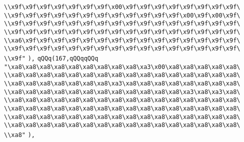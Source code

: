 \verb|\\x9f\x9f\x9f\x9f\x9f\x9f\x9f\x00\x9f\x9f\x9f\x9f\x9f\x9f\x9f\x9f\|\newline
\verb|\\x9f\x9f\x9f\x9f\x9f\x9f\x9f\x9f\x9f\x9f\x9f\x9f\x00\x9f\x00\x9f\|\newline
\verb|\\x9f\x9f\x9f\x9f\x9f\x9f\x9f\x9f\x9f\x9f\x9f\x9f\x9f\x9f\x9f\x9f\|\newline
\verb|\\x9f\x9f\x9f\x9f\x9f\x9f\x9f\x9f\x9f\x9f\x9f\x9f\x9f\x9f\x9f\x9f\|\newline
\verb|\\xa6\x9f\x9f\x9f\x9f\x9f\x9f\x9f\x9f\x9f\x9f\x9f\x9f\x9f\x9f\x9f\|\newline
\verb|\\x9f\x9f\x9f\x9f\x9f\x9f\x9f\x9f\x9f\x9f\x9f\x9f\x9f\x9f\x9f\x9f\|\newline
\verb|\\x9f"|\newline
\verb|),|\newline
\verb|qQQq(167,qQQqqQQq|\newline
\verb|"\xa8\xa8\xa8\xa8\xa8\xa8\xa8\xa8\xa8\xa3\x00\xa8\xa8\xa8\xa8\xa8\|\newline
\verb|\\xa8\xa8\xa8\xa8\xa8\xa8\xa8\xa8\xa8\xa8\xa8\xa8\xa8\xa8\xa8\xa8\|\newline
\verb|\\xa8\xa8\xa8\xa8\xa8\xa8\xa8\xa3\xa8\xa8\xa8\xa8\xa8\xa8\xa8\xa8\|\newline
\verb|\\xa8\xa8\xa8\xa8\xa8\xa8\xa8\xa8\xa8\xa8\xa8\xa8\xa3\xa8\xa3\xa8\|\newline
\verb|\\xa8\xa8\xa8\xa8\xa8\xa8\xa8\xa8\xa8\xa8\xa8\xa8\xa8\xa8\xa8\xa8\|\newline
\verb|\\xa8\xa8\xa8\xa8\xa8\xa8\xa8\xa8\xa8\xa8\xa8\xa8\xa8\xa8\xa8\xa8\|\newline
\verb|\\xa8\xa8\xa8\xa8\xa8\xa8\xa8\xa8\xa8\xa8\xa8\xa8\xa8\xa8\xa8\xa8\|\newline
\verb|\\xa8\xa8\xa8\xa8\xa8\xa8\xa8\xa8\xa8\xa8\xa8\xa8\xa8\xa8\xa8\xa8\|\newline
\verb|\\xa8"|\newline
\verb|),|\newline
